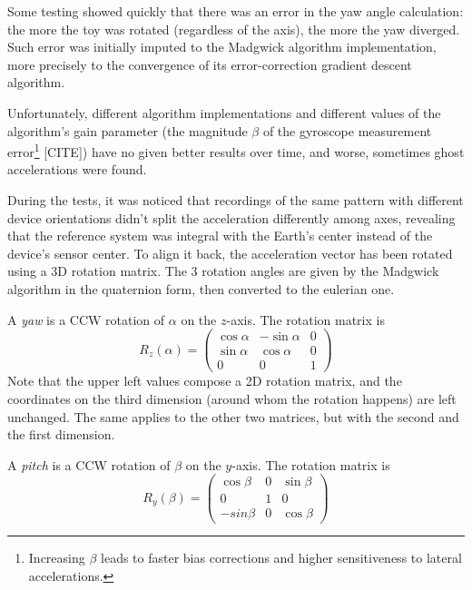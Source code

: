 Some testing showed quickly that there was an error in the yaw angle calculation: the more the toy was rotated (regardless of the axis), the more the yaw diverged. Such error was initially imputed to the Madgwick algorithm implementation, more precisely to the convergence of its error-correction gradient descent algorithm.

Unfortunately, different algorithm implementations and different values of the algorithm's gain parameter (the magnitude $\beta$ of the gyroscope measurement error\footnote{Increasing $\beta$ leads to faster bias corrections and higher sensitiveness to lateral accelerations.} [CITE]) have no given better results over time, and worse, sometimes ghost accelerations were found.

During the tests, it was noticed that recordings of the same pattern with different device orientations didn't split the acceleration differently among axes, revealing that the reference system was integral with the Earth's center instead of the device's sensor center. To align it back, the acceleration vector has been rotated using a 3D rotation matrix. The 3 rotation angles are given by the Madgwick algorithm in the quaternion form, then converted to the eulerian one.
\bigbreak

A \textit{yaw} is a CCW rotation of $\alpha$ on the $z$-axis. The rotation matrix is
\[
	R_z(\alpha) =
	\begin{pmatrix}
		\cos\alpha & -\sin\alpha & 0 \\
		\sin\alpha & \cos\alpha & 0 \\
		0 & 0 & 1
	\end{pmatrix}
\]
Note that the upper left values compose a 2D rotation matrix, and the coordinates on the third dimension (around whom the rotation happens) are left unchanged. The same applies to the other two matrices, but with the second and the first dimension.
\bigbreak

A \textit{pitch} is a CCW rotation of $\beta$ on the $y$-axis. The rotation matrix is
\[
	R_y(\beta) =
	\begin{pmatrix}
		\cos\beta & 0 & \sin\beta \\
		0 & 1 & 0 \\
		-sin\beta & 0 & \cos\beta
	\end{pmatrix}
\]

